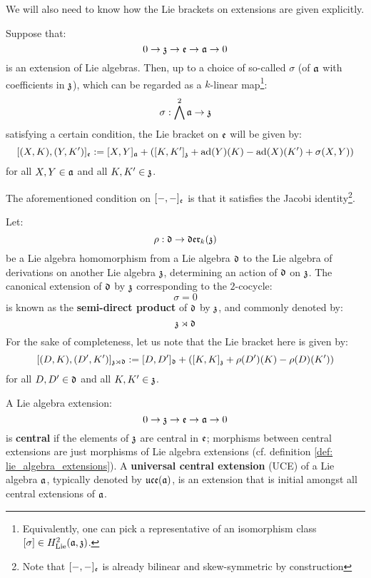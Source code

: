         We will also need to know how the Lie brackets on extensions are given explicitly. 
        \begin{proposition} \label{prop: lie_brackets_on_extensions}
            Suppose that:
                $$0 \to \mathfrak{z} \to \mathfrak{e} \to \mathfrak{a} \to 0$$
            is an extension of Lie algebras. Then, up to a choice of so-called  $\sigma$ (of $\mathfrak{a}$ with coefficients in $\mathfrak{z}$), which can be regarded as a $k$-linear map\footnote{Equivalently, one can pick a representative of an isomorphism class $[\sigma] \in H^2_{\mathrm{Lie}}(\mathfrak{a}, \mathfrak{z})$.}:
                $$\sigma: \bigwedge^2 \mathfrak{a} \to \mathfrak{z}$$
            satisfying a certain condition, the Lie bracket on $\mathfrak{e}$ will be given by:
                $$[ (X, K), (Y, K') ]_{\mathfrak{e}} := [X, Y]_{\mathfrak{a}} + ( [K, K']_{\mathfrak{z}} + \mathrm{ad}(Y)(K) - \mathrm{ad}(X)(K') + \sigma(X, Y) )$$
            for all $X, Y \in \mathfrak{a}$ and all $K, K' \in \mathfrak{z}$.
            
            The aforementioned condition on $[-, -]_{\mathfrak{e}}$ is that it satisfies the Jacobi identity\footnote{Note that $[-, -]_{\mathfrak{e}}$ is already bilinear and skew-symmetric by construction}.
        \end{proposition}
        \begin{example} \label{example: lie_algebra_semi_direct_products}
            Let:
                $$\rho: \mathfrak{d} \to \mathfrak{der}_k(\mathfrak{z})$$
            be a Lie algebra homomorphism from a Lie algebra $\mathfrak{d}$ to the Lie algebra of derivations on another Lie algebra $\mathfrak{z}$, determining an action of $\mathfrak{d}$ on $\mathfrak{z}$. The canonical extension of $\mathfrak{d}$ by $\mathfrak{z}$ corresponding to the $2$-cocycle:
                $$\sigma = 0$$
            is known as the \textbf{semi-direct product} of $\mathfrak{d}$ by $\mathfrak{z}$, and commonly denoted by:
                $$\mathfrak{z} \rtimes \mathfrak{d}$$
            For the sake of completeness, let us note that the Lie bracket here is given by:
                $$[ (D, K), (D', K') ]_{\mathfrak{z} \rtimes \mathfrak{d}} := [D, D']_{\mathfrak{d}} + ( [K, K]_{\mathfrak{z}} + \rho(D')(K) - \rho(D)(K') )$$
            for all $D, D' \in \mathfrak{d}$ and all $K, K' \in \mathfrak{z}$.
        \end{example}
        \begin{definition}
            A Lie algebra extension:
                $$0 \to \mathfrak{z} \to \mathfrak{e} \to \mathfrak{a} \to 0$$
            is \textbf{central} if the elements of $\mathfrak{z}$ are central in $\mathfrak{e}$; morphisms between central extensions are just morphisms of Lie algebra extensions (cf. definition \ref{def: lie_algebra_extensions}). A \textbf{universal central extension} (UCE) of a Lie algebra $\mathfrak{a}$, typically denoted by $\mathfrak{uce}(\mathfrak{a})$, is an extension that is initial amongst all central extensions of $\mathfrak{a}$.
        \end{definition}

